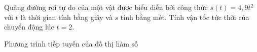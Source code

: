 \begin{bt}%
	Quãng đường rơi tự do của một vật được biểu diễn bởi công thức $s(t)=4{,}9t^2$ với $t$ là thời gian tính bằng giây và $s$ tính bằng mét. Tính vận tốc tức thời của chuyển động lúc $t=2$.
\end{bt}
\begin{dang}{Phương trình tiếp tuyến của đồ thị hàm số }
\end{dang}
